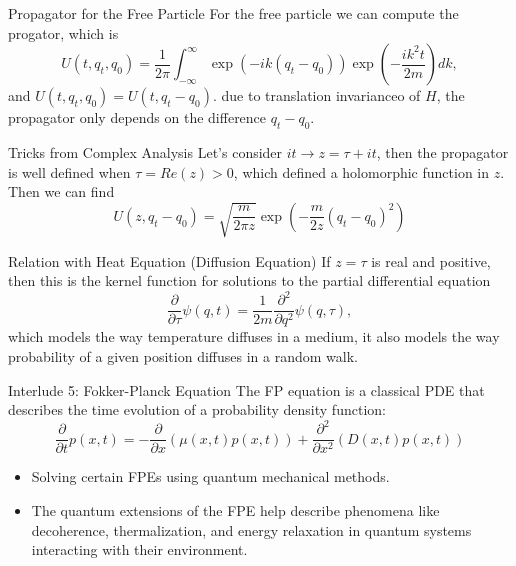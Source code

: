 \documentclass[12pt]{beamer}
\begin{document}
\begin{frame}{Propagator for the Free Particle}
For the free particle we can compute the progator, which is 
\begin{displaymath}
  U(t,q_t,q_0) = \frac{1}{2\pi}\int_{-\infty}^{\infty}\exp(-ik(q_t - q_0))\exp(-\frac{ik^2 t}{2m})dk,
\end{displaymath}
and $U(t,q_t,q_0) = U(t,q_t-q_0)$.
due to translation invarianceo of $H$, the propagator only depends on the difference $q_t-q_0$.
\end{frame}
\begin{frame}{Tricks from Complex Analysis}
Let's consider $it\rightarrow z=\tau+it$, then the propagator is well defined when $\tau=Re(z)>0$, which defined a holomorphic function in $z$. Then we can find
\begin{displaymath}
  U(z,q_t-q_0)=\sqrt{\frac{m}{2\pi z}}\exp(-\frac{m}{2z}(q_t-q_0)^2)
\end{displaymath}
\end{frame}
\begin{frame}{Relation with Heat Equation (Diffusion Equation)}
If $z=\tau$ is real and positive, then this is the kernel function for solutions to the partial differential equation
\begin{displaymath}
  \frac{\partial}{\partial \tau}\psi(q,t) = \frac{1}{2m}\frac{\partial^2}{\partial q^2}\psi(q,\tau),
\end{displaymath}
which models the way temperature diffuses in a medium, it also models the way probability of a given position diffuses in a random walk.
\end{frame}
\begin{frame}{Interlude 5: Fokker-Planck Equation}
The FP equation is a classical PDE that describes the time evolution of a probability density function:
\begin{displaymath}
  \frac{\partial}{\partial t}p(x,t) = -\frac{\partial}{\partial x}(\mu(x,t)p(x,t)) + \frac{\partial^2}{\partial x^2}(D(x,t)p(x,t))
\end{displaymath}

\begin{itemize}
	\item Solving certain FPEs using quantum mechanical methods.
	\item The quantum extensions of the FPE help describe phenomena like decoherence, thermalization, and energy relaxation in quantum systems interacting with their environment.
\end{itemize}
\end{frame}
\end{document}
